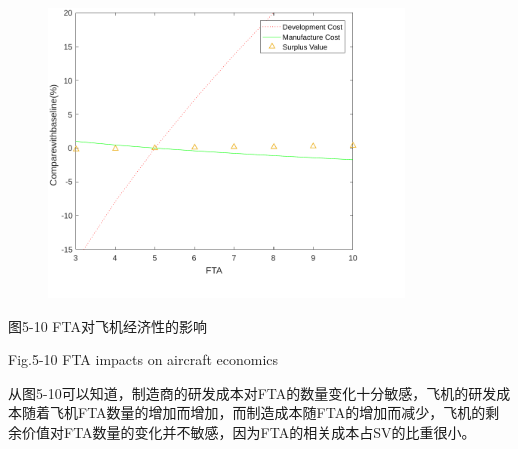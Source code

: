 \documentclass[12pt]{article}
\begin{document}

\begin{figure}[H]
	\begin{Center}
		\includegraphics[width=3.72in,height=3.02in]{./media512/image7.pdf}
	\end{Center}
\end{figure}



\par

\begin{Center}
图5-10 FTA对飞机经济性的影响
\end{Center}\par

\begin{Center}
Fig.5-10 FTA impacts on aircraft economics
\end{Center}\par


\vspace{\baselineskip}
从图5-10可以知道，制造商的研发成本对FTA的数量变化十分敏感，飞机的研发成本随着飞机FTA数量的增加而增加，而制造成本随FTA的增加而减少，飞机的剩余价值对FTA数量的变化并不敏感，因为FTA的相关成本占SV的比重很小。\par


\vspace{\baselineskip}

\printbibliography
\end{document}
